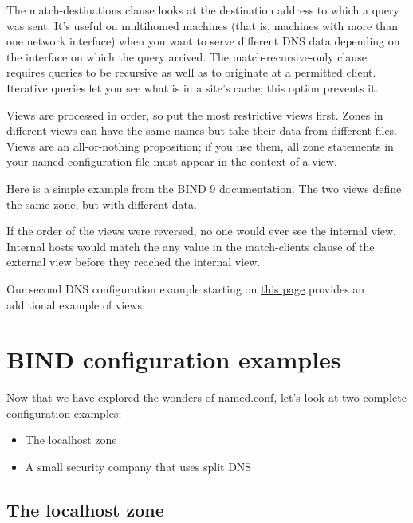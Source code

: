 The {match-destinations} clause looks at the destination address to
which a query was sent. It's useful on multihomed machines (that is,
machines with more than one network interface) when you want to serve
different DNS data depending on the interface on which the query
arrived. The {match-recursive-only} clause requires queries to be
recursive as well as to originate at a permitted client. Iterative
queries let you see what is in a site's cache; this option prevents it.

Views are processed in order, so put the most restrictive views first.
Zones in different views can have the same names but take their data
from different files. Views are an all-or-nothing proposition; if you
use them, all {zone} statements in your {named} configuration file must
appear in the context of a {view}.

Here is a simple example from the BIND 9 documentation. The two views
define the same zone, but with different data.


If the order of the views were reversed, no one would ever see the
internal view. Internal hosts would match the {any} value in the
{match-clients} clause of the external view before they reached the
internal view.

Our second DNS configuration example starting on
\protect\hyperlink{part0024_split_049.htmlux5cux23_idTextAnchor925}{this
page} provides an additional example of views.




\section{BIND configuration examples}

\protect\hypertarget{part0024_split_047.htmlux5cux23_idIndexMarker2214}{}{}Now
that we have explored the wonders of {named.conf}, let's look at two
complete configuration examples:

\begin{itemize}
\item
  The localhost zone
\item
  A small security company that uses split DNS
\end{itemize}

\protect\hypertarget{part0024_split_048.html}{}{}

\hypertarget{part0024_split_048.htmlux5cux23_idContainer1069}{}
\hypertarget{part0024_split_048.htmlux5cux23calibre_pb_47}{%
\subsection[The localhost
zone]{\texorpdfstring{\protect\hypertarget{part0024_split_048.htmlux5cux23_idTextAnchor923}{}{}\protect\hypertarget{part0024_split_048.htmlux5cux23_idIndexMarker2215}{}{}\protect\hypertarget{part0024_split_048.htmlux5cux23_idIndexMarker2216}{}{}\protect\hypertarget{part0024_split_048.htmlux5cux23_idTextAnchor924}{}{}The
localhost
zone}{The localhost zone}}\label{part0024_split_048.htmlux5cux23calibre_pb_47}}


